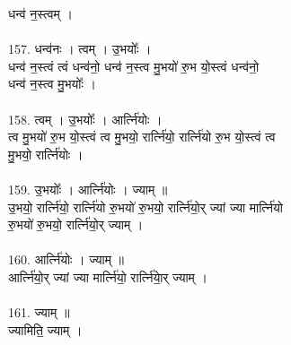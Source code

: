 धन्व॑ न॒स्त्वम् ।\\
\\
157. धन्व॑नः । त्वम् । उ॒भयोः᳚ ।\\
धन्व॑ न॒स्त्वं त्वं धन्व॑नो॒ धन्व॑ न॒स्त्व मु॒भयो॑ रु॒भ यो॒स्त्वं धन्व॑नो॒\\
धन्व॑ न॒स्त्व मु॒भयोः᳚ ।\\
\\
158. त्वम् । उ॒भयोः᳚ । आर्त्नि॑योः ।\\
त्व मु॒भयो॑ रु॒भ यो॒स्त्वं त्व मु॒भयो॒ रार्त्नि॑यो॒ रार्त्नि॑यो रु॒भ यो॒स्त्वं त्व\\
मु॒भयो॒ रार्त्नि॑योः ।\\
\\
159. उ॒भयोः᳚ । आर्त्नि॑योः । ज्याम् ॥\\
उ॒भयो॒ रार्त्नि॑यो॒ रार्त्नि॑यो रु॒भयो॑ रु॒भयो॒ रार्त्नि॑यो॒र् ज्यां ज्या मार्त्नि॑यो\\
रु॒भयो॑ रु॒भयो॒ रार्त्नि॑यो॒र् ज्याम् ।\\
\\
160. आर्त्नि॑योः । ज्याम् ॥\\
आर्त्नि॑यो॒र् ज्यां ज्या मार्त्नि॑यो॒ रार्त्नि॑याे॒र् ज्याम् ।\\
\\
161. ज्याम् ॥\\
ज्यामिति॒ ज्याम् ।\\
\\
